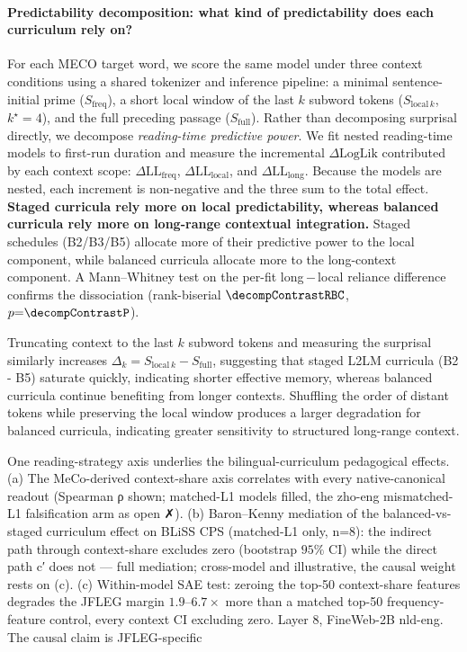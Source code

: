 \documentclass[11pt]{article}
\begin{document}
\paragraph{Predictability decomposition: what kind of predictability does each curriculum rely on?} For each MECO target word, we score the same model under three context conditions using a shared tokenizer and inference pipeline: a minimal sentence-initial prime ($S_{\mathrm{freq}}$), a short local window of the last $k$ subword tokens ($S_{\mathrm{local}\,k}$, $k^{\star}{=}4$), and the full preceding passage
($S_{\mathrm{full}}$). Rather than decomposing surprisal directly, we decompose \emph{reading-time predictive power}. We fit nested reading-time models to first-run duration and measure the incremental $\Delta\mathrm{LogLik}$ contributed by each context scope: $\Delta\mathrm{LL}_{\mathrm{freq}}$, $\Delta\mathrm{LL}_{\mathrm{local}}$, and $\Delta\mathrm{LL}_{\mathrm{long}}$. Because the models are nested, each increment is non-negative and the three sum to the total effect. \textbf{Staged curricula rely more on local predictability, whereas balanced curricula rely more on long-range contextual integration.} Staged schedules (B2/B3/B5) allocate more of their predictive power to the local component, while balanced curricula allocate more to the long-context component. A Mann--Whitney test on the per-fit long\,$-$\,local reliance difference confirms the dissociation (rank-biserial $\decompContrastRBC$, $p{=}\decompContrastP$).

Truncating context to the last $k$ subword tokens and measuring the surprisal similarly increases $\Delta_k{=}S_{\mathrm{local}\,k}-S_{\mathrm{full}}$, suggesting that staged L2LM curricula (B2 - B5) saturate quickly, indicating shorter effective
memory, whereas balanced curricula continue benefiting from longer contexts. Shuffling the order of distant tokens while preserving the local window produces a larger degradation for balanced curricula, indicating greater sensitivity to structured long-range context.

 One reading-strategy axis underlies the bilingual-curriculum pedagogical effects. (a) The MeCo-derived context-share axis correlates with every native-canonical readout (Spearman ρ shown; matched-L1 models filled, the zho-eng mismatched-L1 falsification arm as open ✗). (b) Baron–Kenny mediation of the balanced-vs-staged curriculum effect on BLiSS CPS (matched-L1 only, n=8): the indirect path through context-share excludes zero (bootstrap $95\%$ CI) while the direct path c′ does not — full mediation; cross-model and illustrative, the causal weight rests on (c). (c) Within-model SAE test: zeroing the top-50 context-share features degrades the JFLEG margin $1.9–6.7 \times$ more than a matched top-50 frequency-feature control, every context CI excluding zero. Layer 8, FineWeb-2B nld-eng. The causal claim is JFLEG-specific
\end{document}
